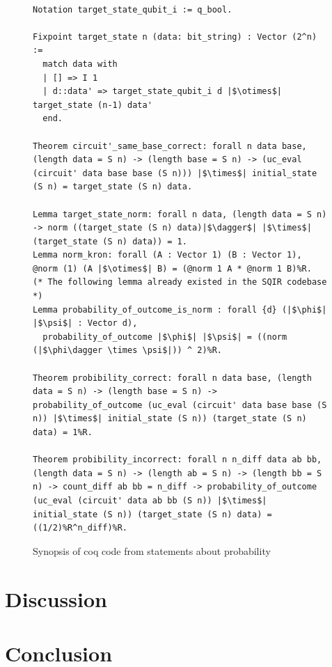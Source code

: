\documentclass{article}
\begin{document}
\begin{figure}
    \centering
\begin{verbatim}

Notation target_state_qubit_i := q_bool.

Fixpoint target_state n (data: bit_string) : Vector (2^n) :=
  match data with
  | [] => I 1
  | d::data' => target_state_qubit_i d |$\otimes$| target_state (n-1) data'
  end.
  
Theorem circuit'_same_base_correct: forall n data base, (length data = S n) -> (length base = S n) -> (uc_eval (circuit' data base base (S n))) |$\times$| initial_state (S n) = target_state (S n) data. 

Lemma target_state_norm: forall n data, (length data = S n) -> norm ((target_state (S n) data)|$\dagger$| |$\times$| (target_state (S n) data)) = 1.
Lemma norm_kron: forall (A : Vector 1) (B : Vector 1), @norm (1) (A |$\otimes$| B) = (@norm 1 A * @norm 1 B)%R.
(* The following lemma already existed in the SQIR codebase *)
Lemma probability_of_outcome_is_norm : forall {d} (|$\phi$| |$\psi$| : Vector d),
  probability_of_outcome |$\phi$| |$\psi$| = ((norm (|$\phi\dagger \times \psi$|)) ^ 2)%R.

Theorem probibility_correct: forall n data base, (length data = S n) -> (length base = S n) -> probability_of_outcome (uc_eval (circuit' data base base (S n)) |$\times$| initial_state (S n)) (target_state (S n) data) = 1%R.

Theorem probibility_incorrect: forall n n_diff data ab bb, (length data = S n) -> (length ab = S n) -> (length bb = S n) -> count_diff ab bb = n_diff -> probability_of_outcome (uc_eval (circuit' data ab bb (S n)) |$\times$| initial_state (S n)) (target_state (S n) data) = ((1/2)%R^n_diff)%R.
\end{verbatim}
    \caption{Synopsis of coq code from statements about probability}
    \label{fig:circuit-prob}
\end{figure}

\section{Discussion}


\section{Conclusion}




\end{document}

